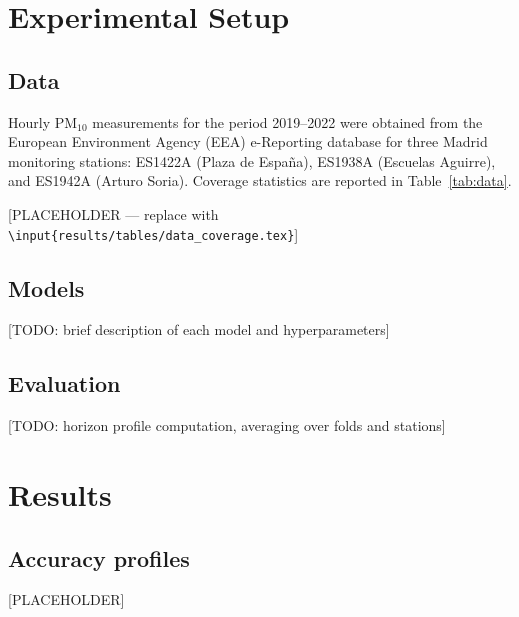 \documentclass[11pt,a4paper]{article}
\begin{document}
\section{Experimental Setup}\label{sec:exp}

\subsection{Data}

Hourly PM$_{10}$ measurements for the period 2019–2022 were obtained from
the European Environment Agency (EEA) e-Reporting database for three Madrid
monitoring stations: ES1422A (Plaza de Espa\~na), ES1938A (Escuelas
Aguirre), and ES1942A (Arturo Soria).
Coverage statistics are reported in Table~\ref{tab:data}.

\begin{table}[H]
  \centering
  \caption{Dataset coverage statistics.}
  \label{tab:data}
  [PLACEHOLDER — replace with \texttt{\textbackslash input\{results/tables/data\_coverage.tex\}}]
\end{table}

\subsection{Models}

[TODO: brief description of each model and hyperparameters]

\subsection{Evaluation}

[TODO: horizon profile computation, averaging over folds and stations]

\section{Results}\label{sec:results}

\subsection{Accuracy profiles}

\begin{table}[H]
  \centering
  \caption{Full metric comparison averaged over 16 folds and 3 stations.}
  \label{tab:full}
  [PLACEHOLDER]
\end{table}
\end{document}
